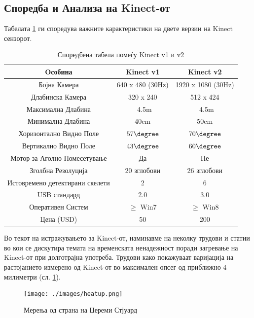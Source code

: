 \documentclass[11pt]{article}
\begin{document}
  \subsection{Споредба и Анализа на Kinect-от}
    Табелата \ref{tab:comparison} ги споредува важните карактеристики на двете верзии на Kinect сензорот.
    \begin{table}[H]
      \centering
      \label{tab:comparison}
      \caption{Споредбена табела помеѓу Kinect v1 и v2}
      \begin{tabular}{||c|c|c||}
        \hline
        \textbf{Oсобина} & \textbf{Kinect v1} & \textbf{Kinect v2} \\
        \hline
        Бојна Камера & 640 x 480 (30Hz) & 1920 x 1080 (30Hz) \\
        \hline
        Длабинска Камера & 320 x 240 & 512 x 424 \\
        \hline
        Максимална Длабина & ~4.5m & ~4.5m \\
        \hline
        Минимална Длабина & 40cm & 50cm \\
        \hline
        Хоризонтално Видно Поле & $57\degree$ & $70\degree$ \\
        \hline
        Вертикално Видно Поле & $43\degree$ & $60\degree$ \\
        \hline
        Мотор за Аголно Помесетување & Да & Не \\
        \hline
        Зголбна Резолуција & 20 зглобови & 26 зглобови \\
        \hline
        Истовремено детектирани скелети &  2 & 6 \\
        \hline
        USB стандард & 2.0 & 3.0 \\
        \hline
        Оперативен Систем & $\geq$ Win7 & $\geq$ Win8 \\
        \hline
        Цена (USD) & 50 & 200 \\
        \hline
      \end{tabular}
      \end{table}

    Во текот на истражувањето за Kinect-от, наминавме на неколку трудови и статии во кои се дискутира темата на временската ненадежност поради загревање на Kinect-от при долготрајна употреба. Трудови како \cite{heatup} покажуваат варијација на растојанието измерено од Kinect-от во максимален опсег од приближно 4 милиметри (сл. \ref{fig:heatup}).

    \begin{figure}[H]
      \centering
      \texttt{[image: ./images/heatup.png]}
      \label{fig:heatup}
      \caption{Мерења од страна на Џереми Стјуард \cite{heatup}}
    \end{figure}
\end{document}
